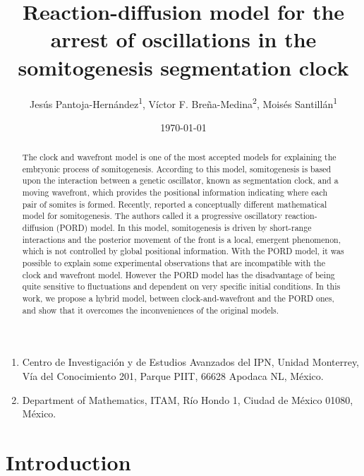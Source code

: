 \documentclass[11pt]{article}
\title{Reaction-diffusion model for the arrest of oscillations in the
	somitogenesis segmentation clock}
\author{Jes\'us Pantoja-Hern\'andez\textsuperscript{1}, V\'ictor F. Bre\~na-Medina\textsuperscript{2}, Mois\'es Santill\'an\textsuperscript{1}}
\date{\today}
\begin{document}
	\maketitle
	
	
\begin{enumerate}
\item Centro de Investigaci\'on y de Estudios Avanzados del IPN, Unidad Monterrey, Vía del Conocimiento 201, Parque PIIT, 66628 Apodaca NL, México.
\item Department of Mathematics, ITAM, Río Hondo 1, Ciudad de México 01080, México.
\end{enumerate}

	\begin{abstract}
	The clock and wavefront model is one of the most accepted models for explaining the embryonic process of somitogenesis. According to this model, somitogenesis is based upon the interaction between a genetic oscillator, known as segmentation clock, and a moving wavefront, which provides the positional information indicating where each pair of somites is formed. Recently, \citet{Cotterell2015} reported a conceptually different mathematical model for somitogenesis. The authors called it a progressive oscillatory reaction-diffusion (PORD) model. In this model, somitogenesis is driven by short-range interactions and the posterior movement of the front is a local, emergent phenomenon, which is not controlled by global positional information. With the PORD model, it was possible to explain some experimental observations that are incompatible with the clock and wavefront model. However the PORD model has the disadvantage of being quite sensitive to fluctuations and dependent on very specific initial conditions. In this work, we propose a hybrid model, between clock-and-wavefront and the PORD ones, and show that it overcomes the inconveniences of the original models.
	\end{abstract}
	
	\section{Introduction}
	\label{intro}
	
\end{document}
